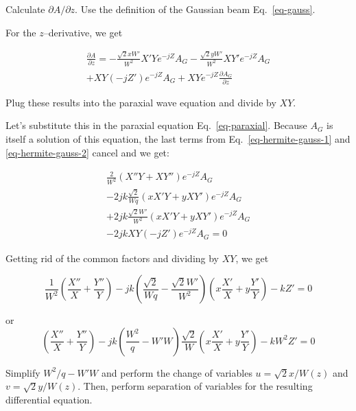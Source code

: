 \begin{cue}
Calculate $\partial A / \partial z$. Use the definition of the Gaussian beam Eq.~\ref{eq-gauss}. 
\end{cue}

For the $z$--derivative, we get

\begin{align}
\frac{\partial A}{\partial z} =  -\frac{\sqrt{2}x W'}{W^2}X'Ye^{-jZ} A_G -\frac{\sqrt{2}y W'}{W^2}XY'e^{-jZ} A_G \nonumber \\ 
+ XY\left(-jZ'\right)e^{-jZ} A_G + XYe^{-jZ}\frac{\partial A_G}{\partial z} \label{eq-hermite-gauss-2}
\end{align} 

\begin{cue}
Plug these results into the paraxial wave equation and divide by $XY$.
\end{cue}

Let's substitute this in the paraxial equation Eq.~\ref{eq-paraxial}. Because $A_G$ is itself a solution of this equation, the last terms from Eq.~\ref{eq-hermite-gauss-1} and \ref{eq-hermite-gauss-2} cancel and we get:

\begin{align}
\frac{2}{W^2}\left(X''Y+XY''\right)e^{-jZ} A_G  \nonumber \\
-2jk \frac{\sqrt{2}}{Wq}\left(xX'Y+yXY'\right)e^{-jZ}A_G \nonumber \\
+2jk \frac{\sqrt{2} W'}{W^2}\left(xX'Y+yXY'\right)e^{-jZ}A_G \nonumber \\
-2jk XY\left(-jZ'\right)e^{-jZ} A_G = 0
\end{align}

Getting rid of the common factors and dividing by $XY$, we get

\begin{equation}
\frac{1}{W^2}\left(\frac{X''}{X}+\frac{Y''}{Y}\right)  
- j k \left(\frac{\sqrt{2}}{Wq} - \frac{\sqrt{2}W'}{W^2}\right)\left(x\frac{X'}{X}+y\frac{Y'}{Y}\right)
-kZ' = 0
\end{equation} 

or
\begin{equation}
\left(\frac{X''}{X}+\frac{Y''}{Y}\right)  
- j k  \left(\frac{W^2}{q} - W'W\right)\frac{\sqrt{2}}{W}\left(x\frac{X'}{X}+y\frac{Y'}{Y}\right)
-kW^2Z' = 0
\end{equation} 

\begin{cue}
Simplify $W^2/q - W'W$ and perform the change of variables $u = \sqrt{2} x / W(z)$ and  $v = \sqrt{2} y / W(z)$. Then, perform separation of variables for the resulting differential equation. 
\end{cue}

